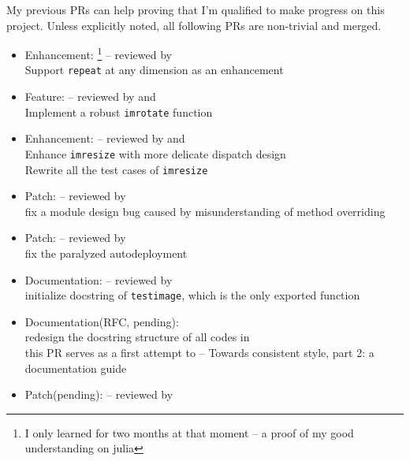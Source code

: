 My previous PRs can help proving that I'm qualified to make progress on this project. Unless explicitly noted, all following PRs are non-trivial and merged.
\begin{itemize}
    \item Enhancement: \footnote{I only learned \langjulia{} for two months at that moment -- a proof of my good understanding on julia}  {\small -- reviewed by \mbauman}\\
      {\small
      Support \texttt{repeat} at any dimension as an enhancement
      }
    \item Feature:  {\small -- reviewed by \evizero and \timholy}\\
      {\small
      Implement a robust \texttt{imrotate} function
      }
    \item Enhancement:  {\small -- reviewed by \evizero and \timholy}\\
      {\small
      Enhance \texttt{imresize} with more delicate dispatch design\\
      Rewrite all the test cases of \texttt{imresize}
      }
    \item Patch:  {\small -- reviewed by \julio}\\
      {\small
      fix a module design bug caused by misunderstanding of method overriding
      }
    \item Patch:  {\small -- reviewed by \evizero}\\
      {\small
      fix the paralyzed autodeployment
      }
    \item Documentation:  {\small -- reviewed by \timholy}\\
      {\small
      initialize docstring of \texttt{testimage}, which is the only exported function
      }
    \item Documentation(RFC, pending): \\
      {\small
      redesign the docstring structure of all codes in \imagebinarization\\
      this PR serves as a first attempt to  -- Towards consistent style, part 2: a documentation guide
      }
    \item Patch(pending):  {\small -- reviewed by \mikeinnes}\\

\end{itemize}
